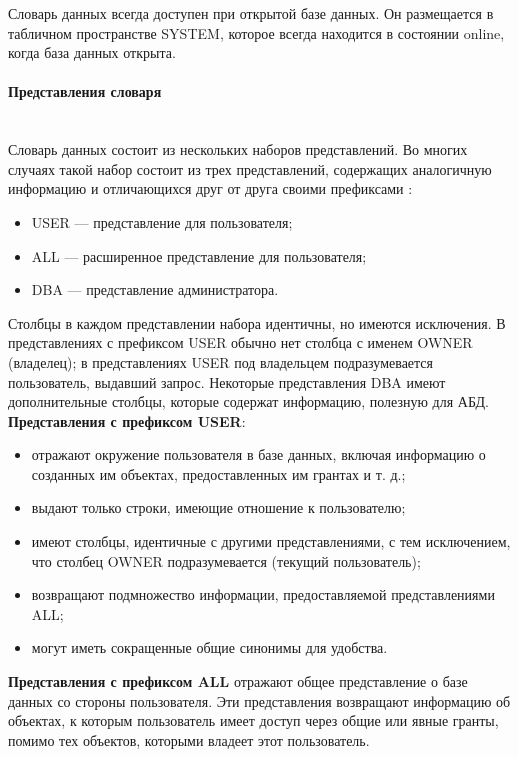 Словарь данных всегда доступен при открытой базе данных. Он размещается
в табличном пространстве SYSTEM, которое всегда находится в состоянии online,
когда база данных открыта.

\paragraph{Представления словаря} ~\\

Словарь данных состоит из нескольких наборов представлений. Во многих
случаях такой набор состоит из трех представлений, содержащих аналогичную информацию и отличающихся друг от друга своими префиксами \autocite{Kirillov2009}:
\begin{itemize}
\item USER — представление для пользователя;
\item ALL — расширенное представление для пользователя;
\item DBA — представление администратора.
\end{itemize}

Столбцы в каждом представлении набора идентичны, но имеются исключения. В представлениях с префиксом USER обычно нет столбца с именем OWNER
(владелец); в представлениях USER под владельцем подразумевается пользователь, выдавший запрос. Некоторые представления DBA имеют дополнительные столбцы, которые содержат информацию, полезную для АБД. ~\\

\textbf{Представления с префиксом USER}:
\begin{itemize}
\item отражают окружение пользователя в базе данных, включая информацию
о созданных им объектах, предоставленных им грантах и т. д.;
\item выдают только строки, имеющие отношение к пользователю;
\item имеют столбцы, идентичные с другими представлениями, с тем исключением, что столбец OWNER подразумевается (текущий пользователь);
\item возвращают подмножество информации, предоставляемой представлениями ALL;
\item могут иметь сокращенные общие синонимы для удобства.
\end{itemize}

\textbf{Представления с префиксом ALL} отражают общее представление о базе
данных со стороны пользователя. Эти представления возвращают информацию об объектах, к которым пользователь имеет доступ через общие или явные гранты, помимо тех объектов, которыми владеет этот пользователь. ~\\

